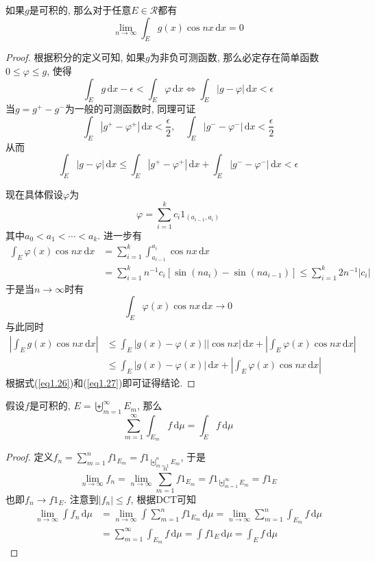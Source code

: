 \documentclass[cn, 12pt, math=mtpro2, bibstyle=apa, blue, twocol]{elegantbook}
\newcommand{\limn}{\lim_{n\to\infty}}
\newcommand{\du}{\,\text{d}\mu}
\begin{document}
\begin{example}
如果$g$是可积的, 那么对于任意$E\in\mathcal{R}$都有
$$\limn\int_E g(x)\cos nx\,\text{d}x=0$$
\end{example}
\begin{proof}
  根据积分的定义可知, 如果$g$为非负可测函数, 那么必定存在简单函数$0\leq\varphi\leq g$, 使得
  $$\int_Eg\,\text{d}x-\epsilon<\int_E\varphi\,\text{d}x\Leftrightarrow\int_E|g-\varphi|\,\text{d}x<\epsilon$$
  当$g=g^+-g^-$为一般的可测函数时, 同理可证
  $$\int_E|g^+-\varphi^+|\,\text{d}x<\frac{\epsilon}{2},\quad \int_E|g^--\varphi^-|\,\text{d}x<\frac{\epsilon}{2}$$
  从而
  \begin{equation}\label{eq1.26}
    \int_E|g-\varphi|\,\text{d}x\leq\int_E|g^+-\varphi^+|\,\text{d}x+\int_E|g^--\varphi^-|\,\text{d}x<\epsilon
  \end{equation}

  现在具体假设$\varphi$为
  $$\varphi=\sum_{i=1}^{k}c_i1_{(a_{i-1},a_i)}$$
  其中$a_0<a_1<\cdots<a_k$. 进一步有
  \begin{align*}
  \int_E\varphi(x)\cos nx\,\text{d}x&=\sum_{i=1}^{k}\int_{a_{i-1}}^{a_i}\cos nx\,\text{d}x \\
  &=\sum_{i=1}^{k}n^{-1}c_i\left[\sin(na_i)-\sin(na_{i-1})\right]\leq\sum_{i=1}^{k}2n^{-1}|c_i|
  \end{align*}
  于是当$n\to\infty$时有
  \begin{equation}\label{eq1.27}
    \int_E \varphi(x)\cos nx\,\text{d}x\to0
  \end{equation}
  与此同时
  \begin{align*}
  \left|\int_Eg(x)\cos nx\,\text{d}x\right|&\leq\int_E|g(x)-\varphi(x)||\cos nx|\,\text{d}x+\left|\int_E\varphi(x)\cos nx\,\text{d}x\right| \\
  &\leq\int_E|g(x)-\varphi(x)|\,\text{d}x+\left|\int_E\varphi(x)\cos nx\,\text{d}x\right|
  \end{align*}
  根据式(\ref{eq1.26})和(\ref{eq1.27})即可证得结论.
\end{proof}
\begin{example}
假设$f$是可积的, $E=\biguplus_{m=1}^\infty E_m$, 那么
$$\sum_{m=1}^{\infty}\int_{E_m}f\,\text{d}\mu=\int_Ef\du$$
\end{example}
\begin{proof}
  定义$f_n=\sum_{m=1}^{n}f1_{E_m}=f1_{\biguplus_{m=1}^nE_m}$, 于是
  $$\limn f_n=\limn\sum_{m=1}^{n}f1_{E_m}=f1_{\biguplus_{m=1}^\infty E_m}=f1_E$$
  也即$f_n\to f1_E$. 注意到$|f_n|\leq f$, 根据DCT可知
  \begin{align*}
  \limn\int f_n\du&=\limn\int\sum_{m=1}^{n}f1_{E_m}\du=\limn\sum_{m=1}^{n}\int_{E_m}f\du \\
  &=\sum_{m=1}^{\infty}\int_{E_m}f\du=\int f1_E\du=\int_Ef\du
  \end{align*}
\end{proof}
\end{document}
